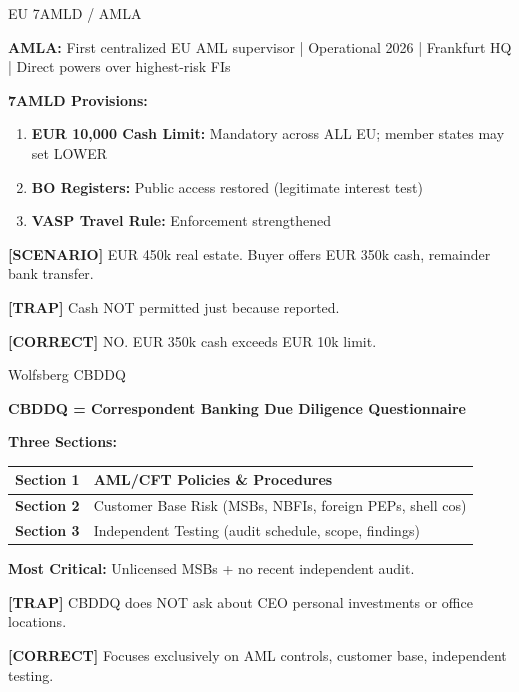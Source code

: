 \documentclass[8pt,aspectratio=169,fontsize=7pt]{beamer}
\renewcommand{\tiny}{\fontsize{4pt}{5pt}\selectfont}
\renewcommand{\normalsize}{\fontsize{8pt}{9pt}\selectfont}
\newcommand{\trap}[1]{%
	\begin{block}{\textcolor{redtrap}{\textbf{[TRAP]}}}
		\textcolor{redtrap}{\tiny #1}
	\end{block}
}
\newcommand{\scenario}[1]{%
	\begin{block}{\textbf{[SCENARIO]}}
		\tiny #1
	\end{block}
}
\newcommand{\correct}[1]{%
	\begin{block}{\textcolor{greencorrect}{\textbf{[CORRECT]}}}
		\textcolor{greencorrect}{\tiny #1}
	\end{block}
}
\begin{document}
	\begin{frame}{\normalsize EU 7AMLD / AMLA}
		
		\textbf{AMLA:} First centralized EU AML supervisor | Operational 2026 | Frankfurt HQ | Direct powers over highest-risk FIs
		
		\textbf{7AMLD Provisions:}
		\begin{enumerate}
			\item \textbf{EUR 10,000 Cash Limit:} Mandatory across ALL EU; member states may set LOWER
			\item \textbf{BO Registers:} Public access restored (legitimate interest test)
			\item \textbf{VASP Travel Rule:} Enforcement strengthened
		\end{enumerate}
		
		\scenario{EUR 450k real estate. Buyer offers EUR 350k cash, remainder bank transfer.}
		
		\trap{Cash NOT permitted just because reported.}
		
		\correct{NO. EUR 350k cash exceeds EUR 10k limit.}
	\end{frame}
	
	\begin{frame}{\normalsize Wolfsberg CBDDQ}
		
		\textbf{CBDDQ = Correspondent Banking Due Diligence Questionnaire}
		
		\textbf{Three Sections:}
		\begin{table}
			\begin{tabular}{|p{2.2cm}|p{6cm}|}
				\hline
				\textbf{Section 1} & AML/CFT Policies \& Procedures \\
				\hline
				\textbf{Section 2} & Customer Base Risk (MSBs, NBFIs, foreign PEPs, shell cos) \\
				\hline
				\textbf{Section 3} & Independent Testing (audit schedule, scope, findings) \\
				\hline
			\end{tabular}
		\end{table}
		
		\textbf{Most Critical:} Unlicensed MSBs + no recent independent audit.
		
		\trap{CBDDQ does NOT ask about CEO personal investments or office locations.}
		
		\correct{Focuses exclusively on AML controls, customer base, independent testing.}
	\end{frame}
	
\end{document}
